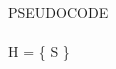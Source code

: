 \documentclass[preview]{standalone}
\begin{document}
\begin{center}
PSEUDOCODE \\\\H = \{ S \}
\end{center}
\end{document}
